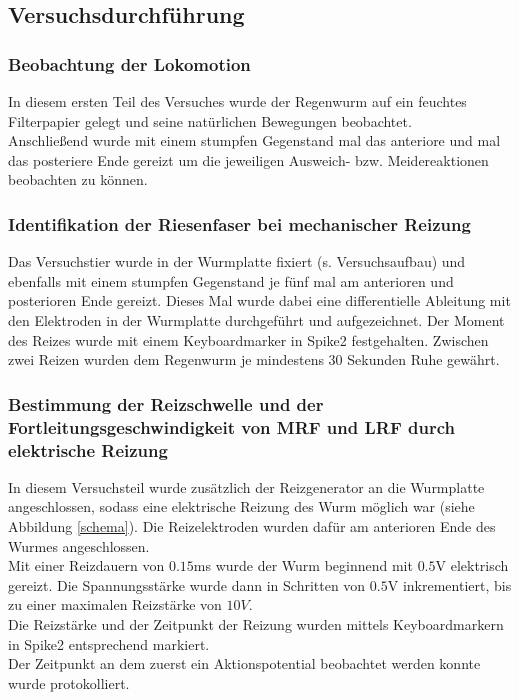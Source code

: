\documentclass[11pt]{article}
\begin{document}
\subsection{Versuchsdurchführung}

\subsubsection{Beobachtung der Lokomotion}
In diesem ersten Teil des Versuches wurde der Regenwurm auf ein feuchtes Filterpapier gelegt und seine natürlichen Bewegungen beobachtet.\\
Anschließend wurde mit einem stumpfen Gegenstand mal das anteriore und mal das posteriere Ende gereizt um die jeweiligen Ausweich- bzw. Meidereaktionen beobachten zu können. 

\subsubsection{Identifikation der Riesenfaser bei mechanischer Reizung}
Das Versuchstier wurde in der Wurmplatte fixiert (s. Versuchsaufbau) und ebenfalls mit einem stumpfen Gegenstand je fünf mal am anterioren und posterioren Ende gereizt. Dieses Mal wurde dabei eine differentielle Ableitung mit den Elektroden in der Wurmplatte durchgeführt und aufgezeichnet. Der Moment des Reizes wurde mit einem Keyboardmarker in Spike2 festgehalten. Zwischen zwei Reizen wurden dem Regenwurm je mindestens 30 Sekunden Ruhe gewährt.

\subsubsection{Bestimmung der Reizschwelle und der Fortleitungsgeschwindigkeit von MRF und LRF durch elektrische Reizung}
In diesem Versuchsteil wurde zusätzlich der Reizgenerator an die Wurmplatte angeschlossen, sodass eine elektrische Reizung des Wurm möglich war (siehe Abbildung \ref{schema}). Die Reizelektroden wurden dafür am anterioren Ende des Wurmes angeschlossen. \\
Mit einer Reizdauern von $0.15$ms wurde der Wurm beginnend mit $0.5$V elektrisch gereizt.  Die Spannungsstärke wurde dann in Schritten von $0.5$V inkrementiert, bis zu einer maximalen Reizstärke von $10V$. \\
Die Reizstärke und der Zeitpunkt der Reizung wurden mittels Keyboardmarkern in Spike2 entsprechend markiert. \\
Der Zeitpunkt an dem zuerst ein Aktionspotential beobachtet werden konnte wurde protokolliert. \\
\end{document}
